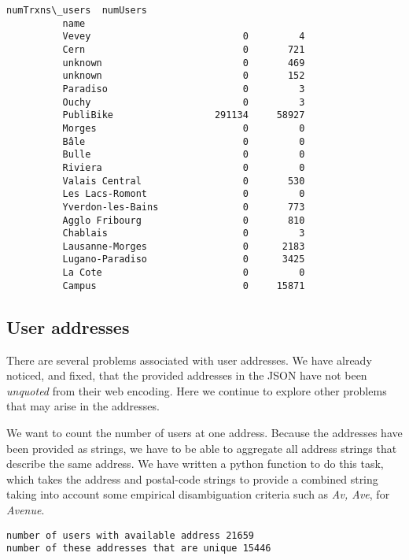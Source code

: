 \documentclass{report}
\begin{document}
\begin{Verbatim}[commandchars=\\\{\}]
                             numTrxns\_users  numUsers  
          name                                         
          Vevey                           0         4  
          Cern                            0       721  
          unknown                         0       469  
          unknown                         0       152  
          Paradiso                        0         3  
          Ouchy                           0         3  
          PubliBike                  291134     58927  
          Morges                          0         0  
          Bâle                            0         0  
          Bulle                           0         0  
          Riviera                         0         0  
          Valais Central                  0       530  
          Les Lacs-Romont                 0         0  
          Yverdon-les-Bains               0       773  
          Agglo Fribourg                  0       810  
          Chablais                        0         3  
          Lausanne-Morges                 0      2183  
          Lugano-Paradiso                 0      3425  
          La Cote                         0         0  
          Campus                          0     15871  
\end{Verbatim}
        
    \subsection{User addresses}\label{user-addresses}

There are several problems associated with user addresses. We have
already noticed, and fixed, that the provided addresses in the JSON have
not been \emph{unquoted} from their web encoding. Here we continue to
explore other problems that may arise in the addresses.

We want to count the number of users at one address. Because the
addresses have been provided as strings, we have to be able to aggregate
all address strings that describe the same address. We have written a
python function to do this task, which takes the address and postal-code
strings to provide a combined string taking into account some empirical
disambiguation criteria such as \emph{Av, Ave}, for \emph{Avenue}.



    \begin{Verbatim}[commandchars=\\\{\}]
number of users with available address 21659
number of these addresses that are unique 15446
    \end{Verbatim}
\end{document}
